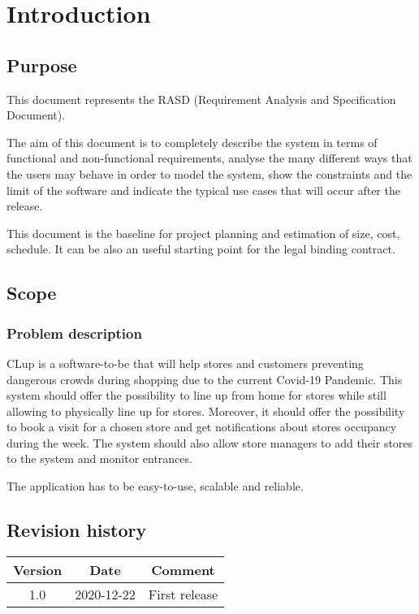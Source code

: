 
\section{Introduction}
\label{sect:introduction}
\subsection{Purpose}
This document represents the RASD (Requirement Analysis and Specification Document).

The aim of this document is to completely describe the system in terms of functional and non-functional requirements, analyse the many different ways that the users may behave in order to model the system, show the constraints and the limit of the software and indicate the typical use cases that will
occur after the release.
 
This document is the baseline for project planning and estimation of size, cost, schedule. It can be also an useful starting point for the legal binding contract.

\subsection{Scope}
\subsubsection{Problem description}
CLup is a software-to-be that will help stores and customers preventing dangerous crowds during shopping due to the current Covid-19 Pandemic. This system should offer the possibility to line up from home for stores while still allowing to physically line up for stores. Moreover, it should offer the possibility to book a visit for a chosen store and get notifications about stores occupancy during the week.
The system should also allow store managers to add their stores to the system and monitor entrances.

The application has to be easy-to-use, scalable and reliable.




\subsection{Revision history}
\begin{center}
	\begin{tabular}{c | c | c}	
		Version & Date & Comment \\ \hline
		1.0 & 2020-12-22 & First release
	\end{tabular}
\end{center}


